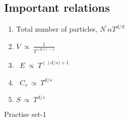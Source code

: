 \subsection{Important relations}
\begin{enumerate}
	\item Total number of particles, $N^{\prime} \alpha T^{d / S}$\\
	\item$V\  \propto\  \frac{1}{T^{(d/s)-1}}$ \\
	\item\  $E \ \propto \ T^{()d /s)+1}$\\
	\item\  $C_{v} \ \propto\  T^{d / s}$\\
	\item $S \ \propto\  T^{d / s}$	
\end{enumerate}
\newpage
\begin{abox}
	Practise set-1
\end{abox}
